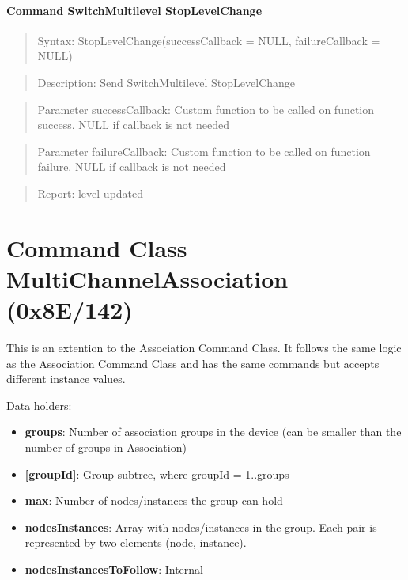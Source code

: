 \paragraph{Command SwitchMultilevel StopLevelChange}
\begin{quote}Syntax: StopLevelChange(successCallback = NULL, failureCallback = NULL)\end{quote}
\begin{quote}Description: Send SwitchMultilevel StopLevelChange\end{quote}
\begin{quote}Parameter successCallback: Custom function to be called on function success. NULL if callback is not needed\end{quote}
\begin{quote}Parameter failureCallback: Custom function to be called on function failure. NULL if callback is not needed\end{quote}
\begin{quote}Report: level updated\end{quote}


\section{Command Class MultiChannelAssociation (0x8E/142)}

This is an extention to the Association Command Class. It follows the same logic as the Association Command Class and has the same commands but accepts different instance values.
\newline

\noindent
Data holders:

\begin{itemize}
\item \textbf{groups}: Number of association groups in the device (can be smaller than the number of groups in Association)
\item \textbf{[groupId]}: Group subtree, where groupId = 1..groups
\item \qquad\textbf{max}: Number of nodes/instances the group can hold
\item \qquad\textbf{nodesInstances}: Array with nodes/instances in the group. Each pair is represented by two elements (node, instance).
\item \qquad\textbf{nodesInstancesToFollow}: Internal
\end{itemize}

